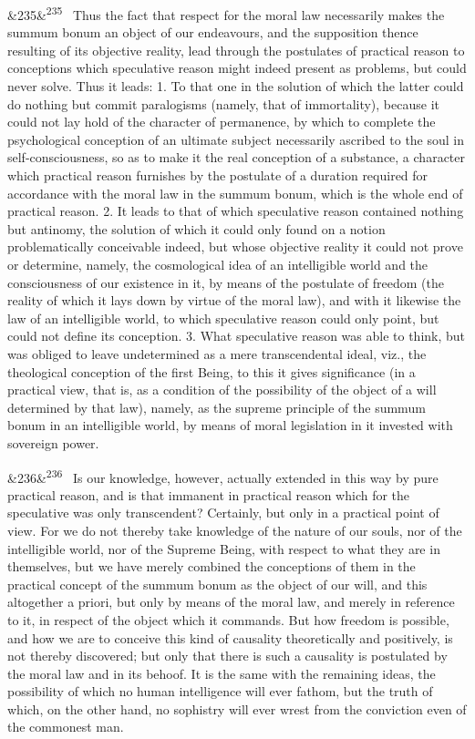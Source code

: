 \documentclass[12pt]{article}
\newcommand{\para}[1][]{\par\noindent\ifx&#1&\else\textsuperscript{\footnotesize #1}~\fi}
\begin{document}
\para[235] Thus the fact that respect for the moral law necessarily makes the summum bonum an object of our endeavours, and the supposition thence resulting of its objective reality, lead through the postulates of practical reason to conceptions which speculative reason might indeed present as problems, but could never solve. Thus it leads: 1. To that one in the solution of which the latter could do nothing but commit paralogisms (namely, that of immortality), because it could not lay hold of the character of permanence, by which to complete the psychological conception of an ultimate subject necessarily ascribed to the soul in self-consciousness, so as to make it the real conception of a substance, a character which practical reason furnishes by the postulate of a duration required for accordance with the moral law in the summum bonum, which is the whole end of practical reason. 2. It leads to that of which speculative reason contained nothing but antinomy, the solution of which it could only found on a notion problematically conceivable indeed, but whose objective reality it could not prove or determine, namely, the cosmological idea of an intelligible world and the consciousness of our existence in it, by means of the postulate of freedom (the reality of which it lays down by virtue of the moral law), and with it likewise the law of an intelligible world, to which speculative reason could only point, but could not define its conception. 3. What speculative reason was able to think, but was obliged to leave undetermined as a mere transcendental ideal, viz., the theological conception of the first Being, to this it gives significance (in a practical view, that is, as a condition of the possibility of the object of a will determined by that law), namely, as the supreme principle of the summum bonum in an intelligible world, by means of moral legislation in it invested with sovereign power.

\para[236] Is our knowledge, however, actually extended in this way by pure practical reason, and is that immanent in practical reason which for the speculative was only transcendent? Certainly, but only in a practical point of view. For we do not thereby take knowledge of the nature of our souls, nor of the intelligible world, nor of the Supreme Being, with respect to what they are in themselves, but we have merely combined the conceptions of them in the practical concept of the summum bonum as the object of our will, and this altogether a priori, but only by means of the moral law, and merely in reference to it, in respect of the object which it commands. But how freedom is possible, and how we are to conceive this kind of causality theoretically and positively, is not thereby discovered; but only that there is such a causality is postulated by the moral law and in its behoof. It is the same with the remaining ideas, the possibility of which no human intelligence will ever fathom, but the truth of which, on the other hand, no sophistry will ever wrest from the conviction even of the commonest man.
\end{document}
